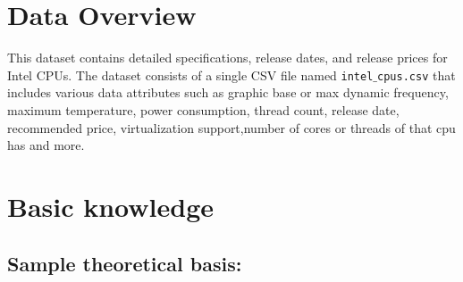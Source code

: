 \documentclass{article}
\begin{document}
	\section{Data Overview}
	This dataset contains detailed specifications, release dates, and release prices for Intel CPUs. The dataset consists of a single CSV file named \texttt{intel$\_$cpus.csv} that includes various data attributes such as graphic base or max dynamic frequency, maximum temperature, power consumption, thread count, release date, recommended price, virtualization support,number of cores or threads of that cpu has and more.
	\section{Basic knowledge}
	\subsection{Sample theoretical basis:}
\end{document}

